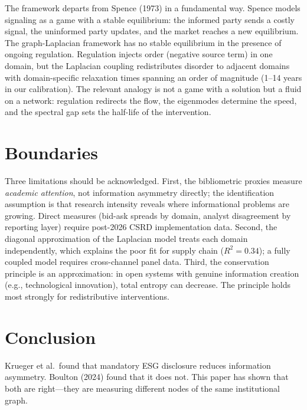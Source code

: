 \documentclass[12pt,a4paper]{article}
\begin{document}
The framework departs from Spence (1973) in a fundamental way. Spence models signaling as a game with a stable equilibrium: the informed party sends a costly signal, the uninformed party updates, and the market reaches a new equilibrium. The graph-Laplacian framework has no stable equilibrium in the presence of ongoing regulation. Regulation injects order (negative source term) in one domain, but the Laplacian coupling redistributes disorder to adjacent domains with domain-specific relaxation times spanning an order of magnitude (1--14 years in our calibration). The relevant analogy is not a game with a solution but a fluid on a network: regulation redirects the flow, the eigenmodes determine the speed, and the spectral gap sets the half-life of the intervention.


\section{Boundaries}
\label{sec:boundaries}

Three limitations should be acknowledged. First, the bibliometric proxies measure \textit{academic attention}, not information asymmetry directly; the identification assumption is that research intensity reveals where informational problems are growing. Direct measures (bid-ask spreads by domain, analyst disagreement by reporting layer) require post-2026 CSRD implementation data. Second, the diagonal approximation of the Laplacian model treats each domain independently, which explains the poor fit for supply chain ($R^2 = 0.34$); a fully coupled model requires cross-channel panel data. Third, the conservation principle is an approximation: in open systems with genuine information creation (e.g., technological innovation), total entropy can decrease. The principle holds most strongly for redistributive interventions.


\section{Conclusion}
\label{sec:conclusion}

Krueger et al.\ found that mandatory ESG disclosure reduces information asymmetry. Boulton (2024) found that it does not. This paper has shown that both are right---they are measuring different nodes of the same institutional graph.
\end{document}
